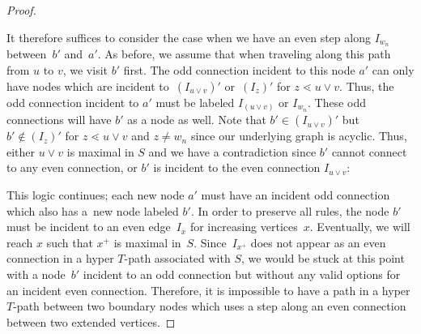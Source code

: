 \documentclass[pdftex]{sigma}
\numberwithin{equation}{section}
\begin{document}
\begin{proof}
\begin{center}
\end{center}

It therefore suffices to consider the case when we have an even step along $I_{w_n}$ between~$b'$ and~$a'$. As before, we assume that when traveling along this path from $u$ to $v$, we visit $b'$ first. The odd connection incident to this node $a'$ can only have nodes which are incident to~$(I_{u \vee v})'$ or~$(I_z)'$ for $z \lessdot u \vee v$. Thus, the odd connection incident to $a'$ must be labeled $I_{(u \vee v)}$ or $I_{w_n}$. These odd connections will have $b'$ as a node as well. Note that $b' \in (I_{u \vee v})'$ but $b' \notin (I_z)'$ for $z \lessdot u \vee v$ and $z \neq w_n$ since our underlying graph is acyclic. Thus, either $u\vee v$ is maximal in $S$ and we have a contradiction since $b'$ cannot connect to any even connection, or $b'$ is incident to the even connection $I_{u \vee v}$:
\begin{center}
\end{center}

This logic continues; each new node $a'$ must have an incident odd connection which also has a~new node labeled $b'$. In order to preserve all rules, the node $b'$ must be incident to an even edge~$I_x$ for increasing vertices~$x$. Eventually, we will reach $x$ such that $x^+$ is maximal in~$S$. Since~$I_{x^+}$ does not appear as an even connection in a hyper $T$-path associated with $S$, we would be stuck at this point with a node~$b'$ incident to an odd connection but without any valid options for an incident even connection. Therefore, it is impossible to have a path in a hyper $T$-path between two boundary nodes which uses a step along an even connection between two extended vertices.


\end{proof}
\end{document}
